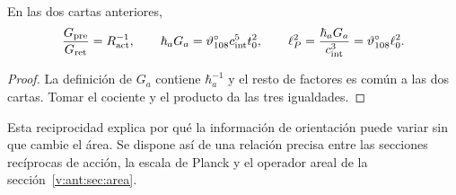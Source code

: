 \begin{proposition}
En las dos cartas anteriores,
\[
\frac{G_{\rm pre}}{G_{\rm ret}}=R_{\rm act}^{-1},\qquad
\hbar_aG_a=\vartheta^\circ_{108}c_{\rm int}^5t_0^2,
\qquad
\ell_P^2=\frac{\hbar_aG_a}{c_{\rm int}^3}
=\vartheta^\circ_{108}\ell_0^2.
\]
\end{proposition}
\begin{proof}
La definición de $G_a$ contiene $\hbar_a^{-1}$ y el resto de factores
es común a las dos cartas. Tomar el cociente y el producto da
las tres igualdades.
\end{proof}
Esta reciprocidad explica por qué la información de orientación puede
variar sin que cambie el área. Se dispone así de una relación precisa
entre las secciones recíprocas de acción, la escala de Planck y el operador areal
de la sección~\ref{v:ant:sec:area}.

